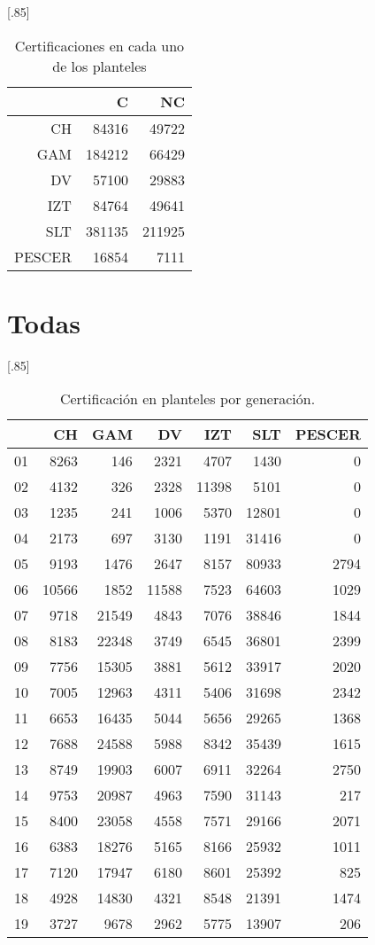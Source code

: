 \documentclass[12pt]{article}
\begin{document}
\begin{table}[ht!]
\centering
\scalebox{0.75}[.85]{
\begin{tabular}{rrr}
  \hline
 & C & NC \\ 
  \hline
CH & 84316 & 49722 \\ 
  GAM & 184212 & 66429 \\ 
  DV & 57100 & 29883 \\ 
  IZT & 84764 & 49641 \\ 
  SLT & 381135 & 211925 \\ 
  PESCER & 16854 & 7111 \\ 
   \hline
\end{tabular}}
\caption{\label{Prob_Cert_Plantel}Certificaciones en cada uno de los planteles}
\end{table}




\section{Todas}
\begin{table}[ht]
\centering
\scalebox{0.75}[.85]{
\begin{tabular}{rrrrrrr}
  \hline
 & CH & GAM & DV & IZT & SLT & PESCER \\ 
  \hline
01 & 8263 & 146 & 2321 & 4707 & 1430 &   0 \\ 
  02 & 4132 & 326 & 2328 & 11398 & 5101 &   0 \\ 
  03 & 1235 & 241 & 1006 & 5370 & 12801 &   0 \\ 
  04 & 2173 & 697 & 3130 & 1191 & 31416 &   0 \\ 
  05 & 9193 & 1476 & 2647 & 8157 & 80933 & 2794 \\ 
  06 & 10566 & 1852 & 11588 & 7523 & 64603 & 1029 \\ 
  07 & 9718 & 21549 & 4843 & 7076 & 38846 & 1844 \\ 
  08 & 8183 & 22348 & 3749 & 6545 & 36801 & 2399 \\ 
  09 & 7756 & 15305 & 3881 & 5612 & 33917 & 2020 \\ 
  10 & 7005 & 12963 & 4311 & 5406 & 31698 & 2342 \\ 
  11 & 6653 & 16435 & 5044 & 5656 & 29265 & 1368 \\ 
  12 & 7688 & 24588 & 5988 & 8342 & 35439 & 1615 \\ 
  13 & 8749 & 19903 & 6007 & 6911 & 32264 & 2750 \\ 
  14 & 9753 & 20987 & 4963 & 7590 & 31143 & 217 \\ 
  15 & 8400 & 23058 & 4558 & 7571 & 29166 & 2071 \\ 
  16 & 6383 & 18276 & 5165 & 8166 & 25932 & 1011 \\ 
  17 & 7120 & 17947 & 6180 & 8601 & 25392 & 825 \\ 
  18 & 4928 & 14830 & 4321 & 8548 & 21391 & 1474 \\ 
  19 & 3727 & 9678 & 2962 & 5775 & 13907 & 206 \\ 
   \hline
\end{tabular}}
\caption{\label{Cert_Gen_Plantel}Certificaci\'on en planteles por generaci\'on.}
\end{table}
\end{document}
